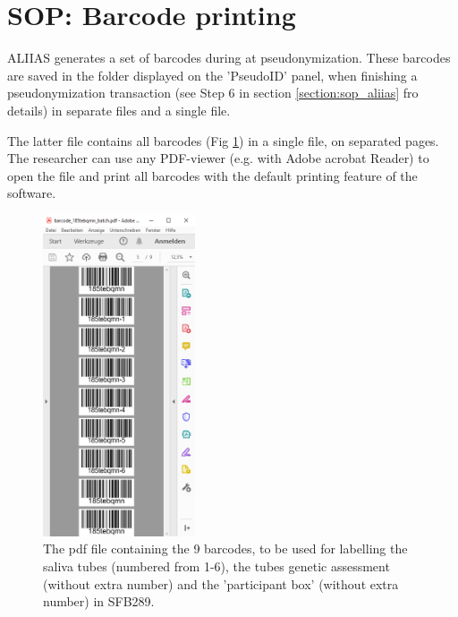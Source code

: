 \pagebreak

\section{SOP: Barcode printing}
\label{section:sop_barcode}

ALIIAS generates a set of barcodes during at pseudonymization. These barcodes are saved in the folder displayed on the 'PseudoID' panel, when finishing a pseudonymization transaction (see Step 6 in section \ref{section:sop_aliias} fro details) in separate  files and a single  file.

The latter file contains all barcodes (Fig \ref{fig:barcodes}) in a single file, on separated pages. The researcher can use any PDF-viewer (e.g. with Adobe acrobat Reader) to open the file and print all barcodes with the default printing feature of the software.


\begin{figure}[H]
\centering
\includegraphics[width=0.4\textwidth]{docs/fig/09_barcodes.PNG}
\caption{The pdf file containing the 9 barcodes, to be used for labelling the saliva tubes (numbered from 1-6), the tubes genetic assessment (without extra number) and the 'participant box' (without extra number) in SFB289.}
\label{fig:barcodes}
\end{figure}